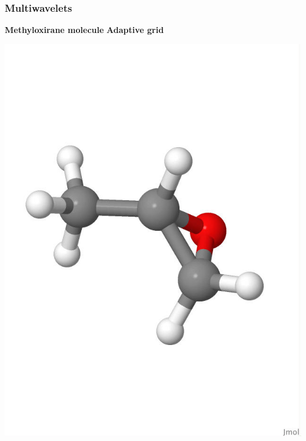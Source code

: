 \begin{frame}
\frametitle{Multiwavelets}
\scriptsize
\centering
\textbf{Methyloxirane molecule}
\hspace{30mm}
\textbf{Adaptive grid}
\begin{minipage}{0.5\textwidth}
\centering
\includegraphics[scale=0.15, viewport = 0 180 550 650, clip]{figures/methyloxirane_white.jpg}
\end{minipage}%
\begin{minipage}{0.5\textwidth}
\centering

\end{minipage}
\end{frame}
